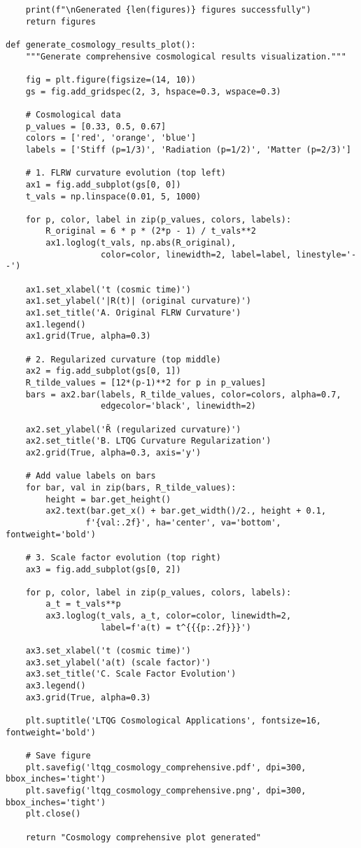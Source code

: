 \documentclass[11pt,a4paper]{article}
\theoremstyle{definition}
\theoremstyle{remark}
\begin{document}
\begin{lstlisting}
    print(f"\nGenerated {len(figures)} figures successfully")
    return figures

def generate_cosmology_results_plot():
    """Generate comprehensive cosmological results visualization."""
    
    fig = plt.figure(figsize=(14, 10))
    gs = fig.add_gridspec(2, 3, hspace=0.3, wspace=0.3)
    
    # Cosmological data
    p_values = [0.33, 0.5, 0.67]
    colors = ['red', 'orange', 'blue']
    labels = ['Stiff (p=1/3)', 'Radiation (p=1/2)', 'Matter (p=2/3)']
    
    # 1. FLRW curvature evolution (top left)
    ax1 = fig.add_subplot(gs[0, 0])
    t_vals = np.linspace(0.01, 5, 1000)
    
    for p, color, label in zip(p_values, colors, labels):
        R_original = 6 * p * (2*p - 1) / t_vals**2
        ax1.loglog(t_vals, np.abs(R_original), 
                   color=color, linewidth=2, label=label, linestyle='--')
    
    ax1.set_xlabel('t (cosmic time)')
    ax1.set_ylabel('|R(t)| (original curvature)')
    ax1.set_title('A. Original FLRW Curvature')
    ax1.legend()
    ax1.grid(True, alpha=0.3)
    
    # 2. Regularized curvature (top middle)
    ax2 = fig.add_subplot(gs[0, 1])
    R_tilde_values = [12*(p-1)**2 for p in p_values]
    bars = ax2.bar(labels, R_tilde_values, color=colors, alpha=0.7, 
                   edgecolor='black', linewidth=2)
    
    ax2.set_ylabel('R̃ (regularized curvature)')
    ax2.set_title('B. LTQG Curvature Regularization')
    ax2.grid(True, alpha=0.3, axis='y')
    
    # Add value labels on bars
    for bar, val in zip(bars, R_tilde_values):
        height = bar.get_height()
        ax2.text(bar.get_x() + bar.get_width()/2., height + 0.1,
                f'{val:.2f}', ha='center', va='bottom', fontweight='bold')
    
    # 3. Scale factor evolution (top right)
    ax3 = fig.add_subplot(gs[0, 2])
    
    for p, color, label in zip(p_values, colors, labels):
        a_t = t_vals**p
        ax3.loglog(t_vals, a_t, color=color, linewidth=2, 
                   label=f'a(t) = t^{{{p:.2f}}}')
    
    ax3.set_xlabel('t (cosmic time)')
    ax3.set_ylabel('a(t) (scale factor)')
    ax3.set_title('C. Scale Factor Evolution')
    ax3.legend()
    ax3.grid(True, alpha=0.3)
    
    plt.suptitle('LTQG Cosmological Applications', fontsize=16, fontweight='bold')
    
    # Save figure
    plt.savefig('ltqg_cosmology_comprehensive.pdf', dpi=300, bbox_inches='tight')
    plt.savefig('ltqg_cosmology_comprehensive.png', dpi=300, bbox_inches='tight')
    plt.close()
    
    return "Cosmology comprehensive plot generated"
\end{lstlisting}
\end{document}
